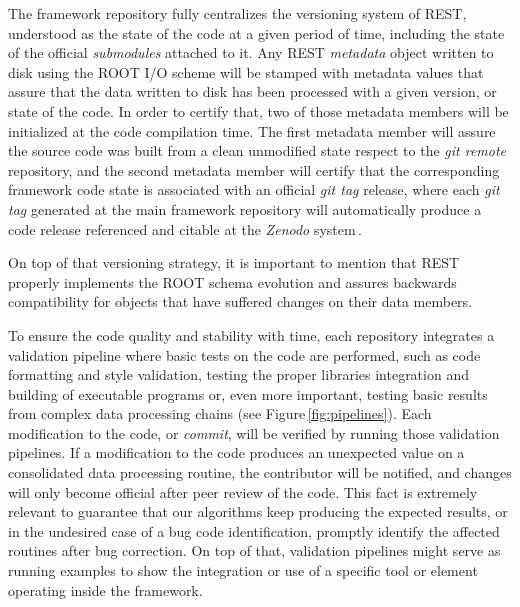 The framework repository fully centralizes the versioning system of REST, understood as the state of the code at a given period of time, including the state of the official \emph{submodules} attached to it. Any REST \emph{metadata} object written to disk using the ROOT I/O scheme will be stamped with metadata values that assure that the data written to disk has been processed with a given version, or state of the code. In order to certify that, two of those metadata members will be initialized at the code compilation time. The first metadata member will assure the source code was built from a clean unmodified state respect to the \emph{git remote} repository, and the second metadata member will certify that the corresponding framework code state is associated with an official \emph{git tag} release, where each \emph{git tag} generated at the main framework repository will automatically produce a code release referenced and citable at the \emph{Zenodo} system\,\cite{javier_galan_2021_4692983}.

On top of that versioning strategy, it is important to mention that REST properly implements the ROOT schema evolution and assures backwards compatibility for objects that have suffered changes on their data members.




To ensure the code quality and stability with time, each repository integrates a validation pipeline where basic tests on the code are performed, such as code formatting and style validation, testing the proper libraries integration and building of executable programs or, even more important, testing basic results from complex data processing chains (see Figure\,\ref{fig:pipelines}). Each modification to the code, or \emph{commit}, will be verified by running those validation pipelines. If a modification to the code produces an unexpected value on a consolidated data processing routine, the contributor will be notified, and changes will only become official after peer review of the code. This fact is extremely relevant to guarantee that our algorithms keep producing the expected results, or in the undesired case of a bug code identification, promptly identify the affected routines after bug correction. On top of that, validation pipelines might serve as running examples to show the integration or use of a specific tool or element operating inside the framework.


